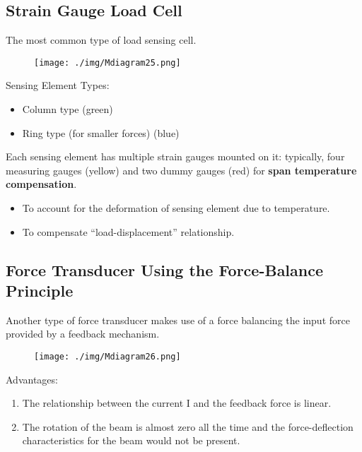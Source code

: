 \subsection{Strain Gauge Load Cell}
The most common type of load sensing cell.
\begin{figure}[H]
  \centering
  \texttt{[image: ./img/Mdiagram25.png]}
\end{figure}
Sensing Element Types:
\begin{itemize}
  \item Column type (green)
  \item Ring type (for smaller forces) (blue)
\end{itemize}
Each sensing element has multiple strain gauges mounted on it: typically, four measuring gauges (yellow) and two dummy gauges (red) for \textbf{span temperature compensation}.
\begin{itemize}
  \item To account for the deformation of sensing element due to temperature.
  \item To compensate “load-displacement” relationship.
\end{itemize}
\subsection{Force Transducer Using the Force-Balance Principle}
Another type of force transducer makes use of a force balancing the input force provided by a feedback mechanism.
\begin{figure}[H]
  \centering
  \texttt{[image: ./img/Mdiagram26.png]}
\end{figure}
Advantages:
\begin{enumerate}
  \item The relationship between the current I and the feedback force is linear.
  \item The rotation of the beam is almost zero all the time and the force-deflection characteristics for the beam would not be present.
\end{enumerate}
